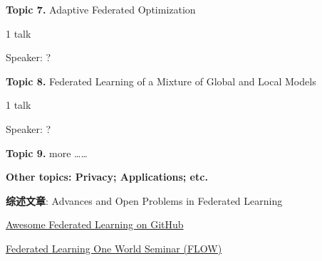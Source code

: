 {\bfseries \large Topic 7.} Adaptive Federated Optimization \cite{reddi2020fed_opt}

1 talk

Speaker: ?

\vspace{2em}

{\bfseries \large Topic 8.} Federated Learning of a Mixture of Global and Local Models \cite{hanzely2020federated}

1 talk

Speaker: ?

\vspace{2em}

{\bfseries \large Topic 9.} more \ldots\ldots

\vspace{3em}

{\bfseries \Large Other topics: Privacy; Applications; etc.}


\vspace{3em}


{\bfseries \Large 综述文章}: Advances and Open Problems in Federated Learning \cite{kairouz2019advances_fl}

\vspace{2em}

\href{https://github.com/chaoyanghe/Awesome-Federated-Learning}{Awesome Federated Learning on GitHub}

\vspace{2em}

\href{https://sites.google.com/view/one-world-seminar-series-flow/home}{Federated Learning One World Seminar (FLOW)}




